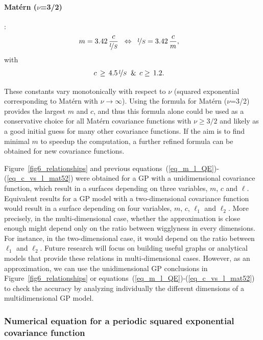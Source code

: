 \paragraph*{Mat\'ern ($\nu$=3/2)}:
%
\begin{align}\label{eq_m_l_mat32}
&m= 3.42 \, \frac{c}{\nicefrac{l}{S}} \;\; \Leftrightarrow \;\; \nicefrac{l}{S}= 3.42 \, \frac{c}{m},
\end{align}
%
with
%
\begin{align}\label{eq_c_vs_l_mat32}
&c \, \geq \, 4.5 \, \nicefrac{l}{S} \;\; \& \;\, c \geq \, 1.2 .       
\end{align}

These constants vary monotonically with respect to $\nu$ (squared exponential corresponding to Mat\'ern with $\nu \to \infty$). Using the formula for Mat\'ern ($\nu$=3/2) provides the largest $m$ and $c$, and thus this formula alone could be used as a conservative choice for all Mat\'ern covariance functions with $\nu \geq 3/2$ and likely as a good initial guess for many other covariance functions. If the aim is to find minimal $m$ to speedup the computation, a further refined formula can be obtained for new covariance functions.

Figure~\ref{fig6_relationships} and previous equations~(\ref{eq_m_l_QE})-(\ref{eq_c_vs_l_mat52}) were obtained for a GP with a unidimensional covariance function, which result in a surfaces depending on three variables, $m$, $c$ and $\ell$. Equivalent results for a GP model with a two-dimensional covariance function would result in a surface depending on four variables, $m$, $c$, $\ell_1$ and $\ell_2$. More precisely, in the multi-dimensional case, whether the approximation is close enough might depend only on the ratio between wigglyness in every dimensions. For instance, in the two-dimensional case, it would depend on the ratio between $\ell_1$ and $\ell_2$. Future research will focus on building useful graphs or analytical models that provide these relations in multi-dimensional cases. However, as an approximation, we can use the unidimensional GP conclusions in Figure~\ref{fig6_relationships} or equations~(\ref{eq_m_l_QE})-(\ref{eq_c_vs_l_mat52}) to check the accuracy by analyzing individually the different dimensions of a multidimensional GP model.

\subsubsection{Numerical equation for a periodic squared exponential covariance function} \label{sec_num_equation_periodic}

